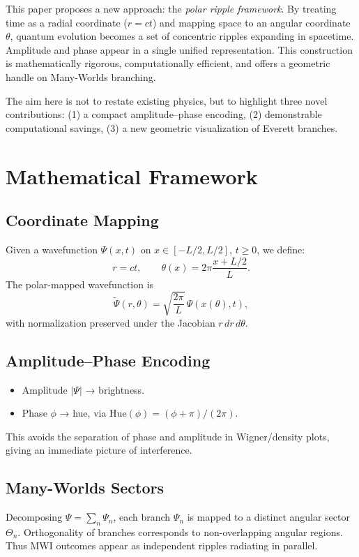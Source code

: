 \documentclass{article}
\begin{document}
This paper proposes a new approach: the \emph{polar ripple framework}. By treating time as a radial coordinate ($r=ct$) and mapping space to an angular coordinate $\theta$, quantum evolution becomes a set of concentric ripples expanding in spacetime. Amplitude and phase appear in a single unified representation. This construction is mathematically rigorous, computationally efficient, and offers a geometric handle on Many-Worlds branching.

The aim here is not to restate existing physics, but to highlight three novel contributions:  
(1) a compact amplitude–phase encoding,  
(2) demonstrable computational savings,  
(3) a new geometric visualization of Everett branches.  

\section{Mathematical Framework}
\subsection{Coordinate Mapping}
Given a wavefunction $\Psi(x,t)$ on $x\in[-L/2,L/2]$, $t\ge0$, we define:
\[
r = c t, \qquad 
\theta(x) = 2\pi \frac{x+L/2}{L}.
\]
The polar-mapped wavefunction is
\[
\tilde{\Psi}(r,\theta) = \sqrt{\frac{2\pi}{L}}\, \Psi(x(\theta),t),
\]
with normalization preserved under the Jacobian $r\,dr\,d\theta$.

\subsection{Amplitude–Phase Encoding}
\begin{itemize}
\item Amplitude $|\Psi|$ → brightness.  
\item Phase $\phi$ → hue, via $\text{Hue}(\phi) = (\phi+\pi)/(2\pi)$.  
\end{itemize}
This avoids the separation of phase and amplitude in Wigner/density plots, giving an immediate picture of interference.

\subsection{Many-Worlds Sectors}
Decomposing $\Psi = \sum_n \Psi_n$, each branch $\Psi_n$ is mapped to a distinct angular sector $\Theta_n$. Orthogonality of branches corresponds to non-overlapping angular regions. Thus MWI outcomes appear as independent ripples radiating in parallel.
\end{document}
